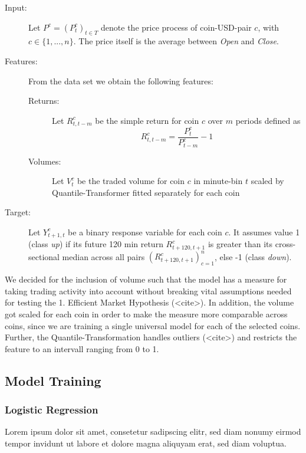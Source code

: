 \begin{description}
    \item[Input:] Let $ P^{c} = ( P^{c}_{t} )_{t \in T} $ denote the price process of coin-USD-pair $ c $, with $ c \in \{1, ... , n\} $. The price itself is the average between \textit{Open} and \textit{Close}.
    \item[Features:] From the data set we obtain the following features:
    \begin{description}
        \item[Returns:] Let $ R^{c}_{t, t - m} $ be the simple return for coin $ c $ over $ m $ periods defined as
        \begin{equation}
            R^{c}_{t, t - m} = \frac{ P^{c}_{t} }{ P^{c}_{t - m} } - 1 
        \end{equation} 
        \item[Volumes:] Let $ V^{c}_{t} $ be the traded volume for coin $ c $ in minute-bin $ t $ scaled by Quantile-Transformer fitted separately for each coin
    \end{description}
    \item[Target:] Let $ Y^{c}_{t + 1, t} $ be a binary response variable for each coin $c$. It assumes value 1 (class \textit{up}) if its future 120 min return $ R^{c}_{t + 120, t + 1} $ is greater than its cross-sectional median across all pairs $ ( R^{c}_{t + 120, t + 1} )^{n}_{c=1} $, else -1 (class \textit{down}).
\end{description}


We decided for the inclusion of volume such that the model has a measure for 
taking trading activity into account without breaking vital assumptions needed for testing the 1. Efficient Market Hypothesis (<cite>).
In addition, the volume got scaled for each coin in order to make the measure more comparable across coins,
since we are training a single universal model for each of the selected coins. 
Further, the Quantile-Transformation handles outliers (<cite>) and restricts the feature to an intervall ranging from 0 to 1.


\subsection{Model Training}

\subsubsection{Logistic Regression}
Lorem ipsum dolor sit amet, consetetur sadipscing elitr, sed diam nonumy eirmod tempor invidunt ut labore et dolore magna aliquyam erat, sed diam voluptua.

